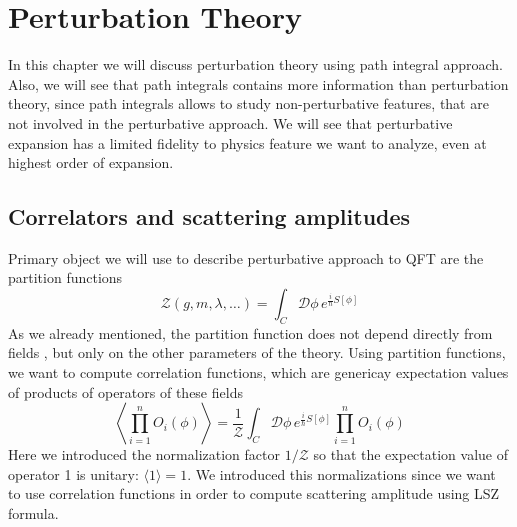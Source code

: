 \documentclass[../main/main.tex]{subfiles}
\begin{document}
\chapter{Perturbation Theory}

In this chapter we will discuss perturbation theory using path integral approach. Also, we will see that path integrals contains more information than perturbation theory, since path integrals allows to study non-perturbative features, that are not involved in the  perturbative approach. We will see that perturbative expansion has a limited fidelity to physics feature we want to analyze, even at highest order of expansion. 

\section{Correlators and scattering amplitudes}

Primary object we will use to describe perturbative approach to QFT are the partition functions
\[\mathcal Z(g,m,\lambda,\dots)=\int_C\mathcal D\phi \,e^{\frac i\hbar S[\phi]}\]
As we already mentioned, the partition function does not depend directly from fields , but only on the other parameters of the theory. Using partition functions, we want to compute correlation functions, which are genericay expectation values of products of operators of these fields
\begin{equation}\label{eqn:exp-value-prod-corr}\boxed{
\left\langle\prod_{i=1}^nO_i(\phi)\right\rangle=\frac1{\mathcal Z}\int_C\mathcal D\phi \,e^{\frac i\hbar S[\phi]}\prod_{i=1}^nO_i(\phi)
}\end{equation}
Here we introduced the normalization factor $1/\mathcal Z$ so that the expectation value of operator 1 is unitary: $\langle1\rangle=1$. We introduced this normalizations since we want to use correlation functions in order to compute scattering amplitude using LSZ formula. 
\end{document}
